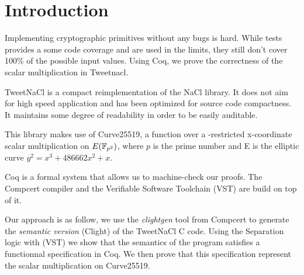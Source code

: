 \section{Introduction}

Implementing cryptographic primitives without any bugs is hard.
While tests provides a some code coverage and are used in the limits,
they still don't cover 100\% of the possible input values.
Using Coq, we prove the correctness of the scalar multiplication in Tweetnacl.

TweetNaCl\cite{BGJ+15} is a compact reimplementation of the
NaCl\cite{BLS12} library. It does not aim for high speed
application and has been optimized for source code compactness.
It maintains some degree of readability in order to be
easily auditable.

This library makes use of Curve25519\cite{Ber06}, a function over a -restricted
x-coordinate scalar multiplication on $E(\mathbb{F}_{p^2})$, where $p$ is the prime number \p
and E is the elliptic curve $y^2 = x^3 + 486662 x^2 + x$.

Coq is a formal system that allows us to machine-check our proofs. The Compcert\cite{Leroy-backend}
compiler and the Verifiable Software Toolchain (VST)\cite{2012-Appel} are build
on top of it.

Our approach is as follow, we use the \textit{clightgen} tool from Compcert to
generate the \textit{semantic version} (Clight\cite{Blazy-Leroy-Clight-09}) of
the TweetNaCl C code. Using the Separation logic\cite{1969-Hoare,Reynolds02separationlogic}
with (VST) we show that the semantics of the program satisfies a functionnal
specification in Coq. We then prove that this specification represent the scalar
multiplication on Curve25519.
